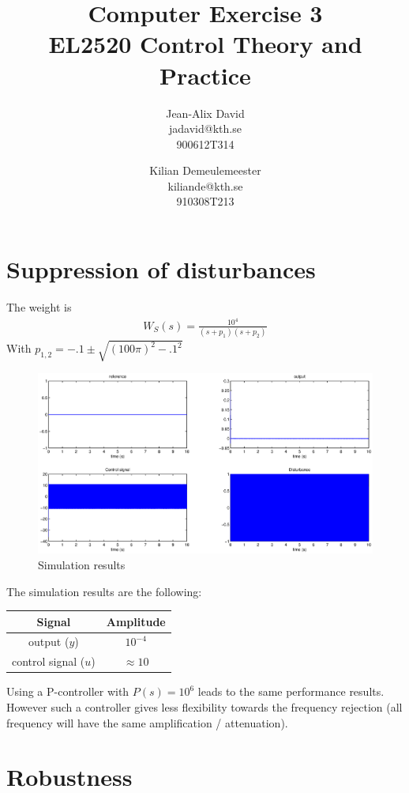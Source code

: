 \documentclass[a4paper,11pt]{article}
\title{
	Computer Exercise 3\\
	EL2520 Control Theory and Practice
}
\author{
	Jean-Alix David\\
	jadavid@kth.se\\
	900612T314
	\and
	Kilian Demeulemeester\\
	kiliande@kth.se\\
	910308T213
}
\begin{document}
	\maketitle

	\section*{Suppression of disturbances}

	The weight is
	\begin{align*}
        W_S(s) = \frac{10^{4}}{(s+p_1)(s+p_2)} 
	\end{align*}
    With $p_{1,2} = -.1 \pm \sqrt{(100\pi)^2-.1^2}$ 

    \begin{figure}[h!b]
        \centering
        \includegraphics[width=.75\columnwidth]{fig/figure1.eps}
        \caption{Simulation results}
    \end{figure}

    The simulation results are the following:
    \begin{center}
        \begin{tabular}{|c|c|}
        \hline
        \textbf{Signal} & \textbf{Amplitude} \\
        \hline
        output ($y$) & $10^{-4}$ \\
        \hline
        control signal ($u$) & $\approx 10$ \\
        \hline
        \end{tabular}
    \end{center}

    Using a P-controller with $P(s) = 10^6$ leads to the same performance results. 
    However such a controller gives less flexibility towards the frequency rejection (all frequency will have the same amplification / attenuation).

	\section*{Robustness}
\end{document}
